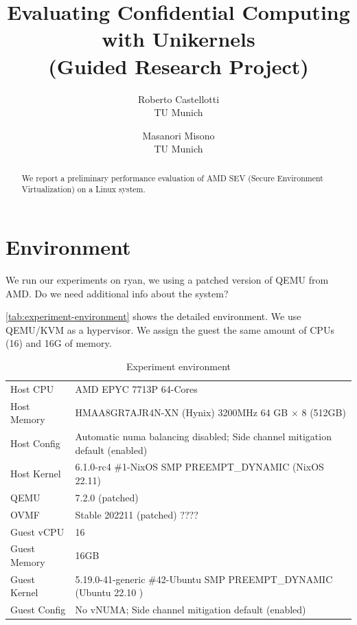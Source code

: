 \documentclass[letterpaper,twocolumn,10pt]{article}
\newcommand{\titlename}{
Evaluating Confidential Computing with Unikernels \\ (Guided Research Project)
}
\begin{document}
\date{}
\title{\Large \bf \titlename}

\author{
{\rm Roberto Castellotti}\\TU Munich
\and
{\rm Masanori Misono}\\TU Munich
}

\maketitle

\begin{abstract}
We report a preliminary performance evaluation of AMD SEV (Secure Environment Virtualization) on a Linux system.
\end{abstract}

\section{Environment}

We run our experiments on ryan, we using a patched version of QEMU from AMD.
Do we need additional info about the system?

\autoref{tab:experiment-environment} shows the detailed environment.
We use QEMU/KVM as a hypervisor.
We assign the guest the same amount of CPUs (16) and 16G of memory.

\begin{table}[t]
\centering
\caption{Experiment environment}
\label{tab:experiment-environment}
\begin{tabular}{l|l}
\toprule
    Host CPU      & AMD EPYC 7713P 64-Cores  \\
    Host Memory   & HMAA8GR7AJR4N-XN (Hynix) 3200MHz 64 GB $\times$ 8 (512GB) \\
    Host Config   & Automatic numa balancing disabled; Side channel mitigation default (enabled) \\
    Host Kernel   & 6.1.0-rc4 \#1-NixOS SMP PREEMPT\_DYNAMIC (NixOS 22.11) \\
    QEMU          & 7.2.0 (patched) \\
\midrule
    OVMF          & Stable 202211 (patched) ????  \\
    Guest vCPU    & 16 \\
    Guest Memory  & 16GB  \\
    Guest Kernel  & 5.19.0-41-generic \#42-Ubuntu SMP PREEMPT\_DYNAMIC (Ubuntu 22.10
    ) \\
    Guest Config  & No vNUMA; Side channel mitigation default (enabled) \\
\bottomrule
\end{tabular}
\end{table}
\end{document}
